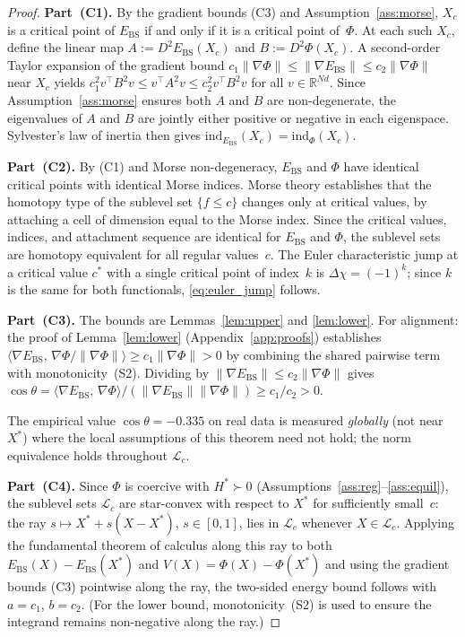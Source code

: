 \documentclass[final]{siamltex}
\newcommand{\R}{\mathbb{R}}
\newcommand{\norm}[1]{\lVert #1 \rVert}
\newcommand{\inner}[2]{\langle #1,\, #2 \rangle}
\providecommand{\grad}{\nabla}
\newcommand{\Ebs}{E_{\mathrm{BS}}}
\newcommand{\Xst}{X^*}
\newcommand{\costheta}{\cos\theta}
\begin{document}
\begin{proof}
\textbf{Part~(C1).}
By the gradient bounds (C3) and Assumption~\ref{ass:morse},
$X_c$ is a critical point of $\Ebs$ if and only if it is a
critical point of~$\Phi$. At each such $X_c$, define the
linear map $A:=D^2\Ebs(X_c)$ and $B:=D^2\Phi(X_c)$.
A second-order Taylor expansion of the gradient bound
$c_1\norm{\grad\Phi}\le\norm{\grad\Ebs}\le c_2\norm{\grad\Phi}$
near $X_c$ yields $c_1^2 v^\top B^2 v \le v^\top A^2 v \le
c_2^2 v^\top B^2 v$ for all $v\in\R^{Nd}$.  Since
Assumption~\ref{ass:morse} ensures both $A$ and $B$ are
non-degenerate, the eigenvalues of $A$ and $B$ are jointly
either positive or negative in each eigenspace.
Sylvester's law of inertia then gives
$\mathrm{ind}_{\Ebs}(X_c) = \mathrm{ind}_\Phi(X_c)$.

\textbf{Part~(C2).}
By (C1) and Morse non-degeneracy, $\Ebs$ and $\Phi$ have
identical critical points with identical Morse indices.
Morse theory \cite{milnor1963morse} establishes that the
homotopy type of the sublevel set $\{f \le c\}$ changes only
at critical values, by attaching a cell of dimension equal
to the Morse index.  Since the critical values, indices, and
attachment sequence are identical for $\Ebs$ and $\Phi$, the
sublevel sets are homotopy equivalent for all regular
values~$c$.  The Euler characteristic jump at a critical
value $c^*$ with a single critical point of index~$k$ is
$\Delta\chi = (-1)^k$; since $k$ is the same for both
functionals, \eqref{eq:euler_jump} follows.

\textbf{Part~(C3).} The bounds are Lemmas~\ref{lem:upper} and
\ref{lem:lower}. For alignment: the proof of Lemma~\ref{lem:lower}
(Appendix~\ref{app:proofs}) establishes
$\inner{\grad\Ebs}{\grad\Phi / \norm{\grad\Phi}}
\ge c_1\norm{\grad\Phi} > 0$
by combining the shared pairwise term with monotonicity~(S2).
Dividing by $\norm{\grad\Ebs}\le c_2\norm{\grad\Phi}$ gives
$\costheta = \inner{\grad\Ebs}{\grad\Phi}
/ (\norm{\grad\Ebs}\norm{\grad\Phi}) \ge c_1/c_2 > 0$.

The empirical value $\costheta = -0.335$ on real data is measured
\emph{globally} (not near $\Xst$) where the local assumptions of
this theorem need not hold; the norm equivalence holds throughout
$\mathcal{L}_c$.

\textbf{Part~(C4).} Since $\Phi$ is coercive with
$H^*\succ 0$ (Assumptions~\ref{ass:reg}--\ref{ass:equil}),
the sublevel sets $\mathcal{L}_c$ are star-convex with respect
to $\Xst$ for sufficiently small~$c$: the ray
$s\mapsto\Xst + s(X{-}\Xst)$, $s\in[0,1]$, lies in
$\mathcal{L}_c$ whenever $X\in\mathcal{L}_c$. Applying the
fundamental theorem of calculus along this ray to both
$\Ebs(X) - \Ebs(\Xst)$ and $V(X) = \Phi(X) - \Phi(\Xst)$
and using the gradient bounds (C3) pointwise along the ray,
the two-sided energy bound follows with $a = c_1$, $b = c_2$.
(For the lower bound, monotonicity~(S2) is used to ensure the
integrand remains non-negative along the ray.)


\end{proof}
\end{document}
